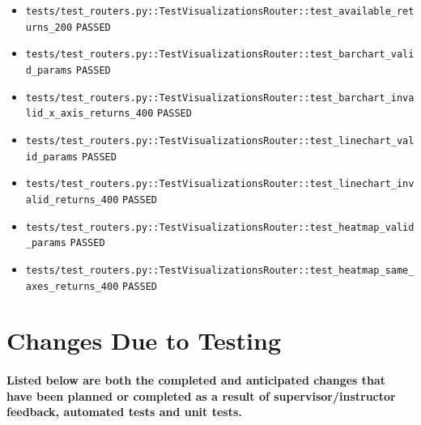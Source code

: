 \documentclass[12pt, titlepage]{article}
\begin{document}
{\begin{itemize}[leftmargin=1.5em, itemsep=0.2em, topsep=0.3em]
  \item \nolinkurl{tests/test_routers.py::TestVisualizationsRouter::test_available_returns_200} \texttt{PASSED}
  \item \nolinkurl{tests/test_routers.py::TestVisualizationsRouter::test_barchart_valid_params} \texttt{PASSED}
  \item \nolinkurl{tests/test_routers.py::TestVisualizationsRouter::test_barchart_invalid_x_axis_returns_400} \texttt{PASSED}
  \item \nolinkurl{tests/test_routers.py::TestVisualizationsRouter::test_linechart_valid_params} \texttt{PASSED}
  \item \nolinkurl{tests/test_routers.py::TestVisualizationsRouter::test_linechart_invalid_returns_400} \texttt{PASSED}
  \item \nolinkurl{tests/test_routers.py::TestVisualizationsRouter::test_heatmap_valid_params} \texttt{PASSED}
  \item \nolinkurl{tests/test_routers.py::TestVisualizationsRouter::test_heatmap_same_axes_returns_400} \texttt{PASSED}
\end{itemize}
}

\section{Changes Due to Testing}

\paragraph{Listed below are both the completed and anticipated changes that have been planned or completed as a result of supervisor/instructor feedback,
automated tests and unit tests.}
\end{document}
